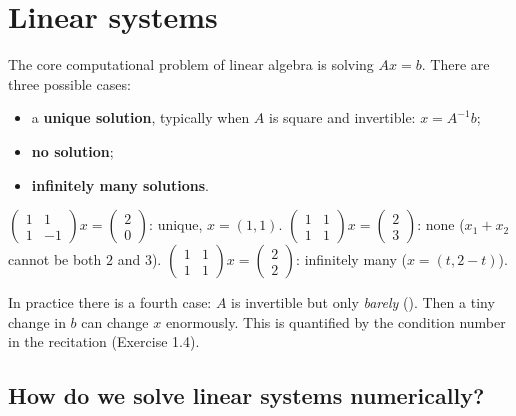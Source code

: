\section{Linear systems}

The core computational problem of linear algebra is solving $Ax=b$. There are three possible cases:
\begin{itemize}
  \item a \textbf{unique solution}, typically when $A$ is square and invertible: $x=A^{-1}b$;
  \item \textbf{no solution};
  \item \textbf{infinitely many solutions}.
\end{itemize}

\begin{example}
$\begin{pmatrix}1&1\\1&-1\end{pmatrix}x=\begin{pmatrix}2\\0\end{pmatrix}$: unique, $x=(1,1)$.\quad
$\begin{pmatrix}1&1\\1&1\end{pmatrix}x=\begin{pmatrix}2\\3\end{pmatrix}$: none ($x_1+x_2$ cannot be both $2$ and $3$).\quad
$\begin{pmatrix}1&1\\1&1\end{pmatrix}x=\begin{pmatrix}2\\2\end{pmatrix}$: infinitely many ($x=(t,2-t)$).
\end{example}

\begin{intuition}
In practice there is a fourth case: $A$ is invertible but only \emph{barely} (). Then a tiny change in $b$ can change $x$ enormously.
This is quantified by the condition number in the recitation (Exercise 1.4).
\end{intuition}

\subsection{How do we solve linear systems numerically?}


